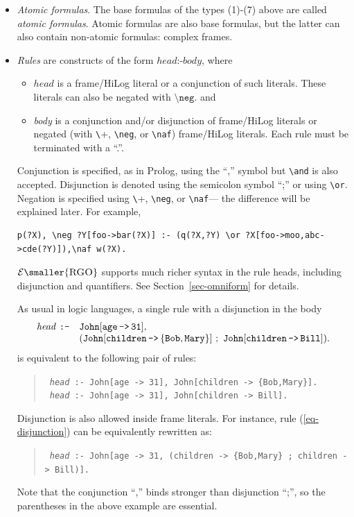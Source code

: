 \documentclass[11pt]{article}
\newcommand{\ERGO}{\ensuremath{\cal{E}\mbox{\smaller{\sc{RGO}}}}\xspace}
\newcommand{\mvd}{{\mbox{\tt \,->\,}}}  %
\newcommand{\bs}{\textbackslash}
\newcommand{\PLGNAF}{\mbox{\texttt{\bs}+}\xspace}
\newcommand{\RULELOGNAF}{{\texttt{{\bs}naf}}\xspace}
\newcommand{\RULELOGNEG}{{\texttt{{\bs}neg}}\xspace}
\begin{document}
\begin{itemize}
\item \emph{Atomic formulas}. The base formulas of the types (1)-(7) above
  are called \emph{atomic formulas}.  Atomic formulas are also base formulas,
  but the latter can also contain non-atomic formulas: complex frames.
  
\item \emph{Rules} are constructs of the form $head \texttt{:-} 
  body$, where
  \begin{itemize}
  \item $head$ is a frame/HiLog literal or a conjunction of such literals.
    These literals can also be negated with $\RULELOGNEG$.
    and
  \item \emph{body} is a conjunction and/or disjunction
    of frame/HiLog literals or negated (with \PLGNAF, \RULELOGNEG, or
    \RULELOGNAF) frame/HiLog literals.
  Each rule must be terminated with a ``.''.
  
  \end{itemize}
  Conjunction is specified, as in Prolog, using the ``,'' symbol but
  \texttt{\bs{}and} is also accepted. Disjunction is denoted
  using the semicolon symbol ``;'' or using \texttt{\bs{}or}.
  Negation is specified using \PLGNAF, \RULELOGNEG,
  or \RULELOGNAF --- the difference will be explained later.
  For example,
\begin{verbatim}
p(?X), \neg ?Y[foo->bar(?X)] :- (q(?X,?Y) \or ?X[foo->moo,abc->cde(?Y)]),\naf w(?X).
\end{verbatim}
  \ERGO supports much richer syntax in the rule heads, including
  disjunction and quantifiers.
  \ifdef{\isfloraman}{}
  {
    See Section~\ref{sec-omniform} for details.
  }

  As usual in logic languages, a single rule 
  with a disjunction in the body
  \begin{equation}\label{eq-disjunction}
    \begin{array}{rl}
    {\it head}~ \texttt{:-}  & \tt John[age{\mvd}31],\\
                  & \tt (John[children\mvd\{Bob,Mary\}]~;~ John[children\mvd Bill]).
    \end{array}
  \end{equation}
  is equivalent to the following pair of rules:
  \begin{quote}
  {\tt
    {\it head}~:-~John[age{\mvd}31],~John[children\mvd\{Bob,Mary\}].
    }
  \\
  {\tt
    {\it head}~:-~John[age{\mvd}31],~John[children\mvd Bill].
    }
  \end{quote}
  Disjunction is also allowed inside frame literals. For instance, rule
  (\ref{eq-disjunction}) can be equivalently rewritten as:
  \begin{quote}
 {\tt
   {\it head}~:-~John[age{\mvd}31,~(children\mvd\{Bob,Mary\}~;~children\mvd Bill)].
   }
  \end{quote}
  Note that the conjunction ``,'' binds stronger than disjunction ``;'', so the
  parentheses in the above example are essential.
  

\end{itemize}
\end{document}
